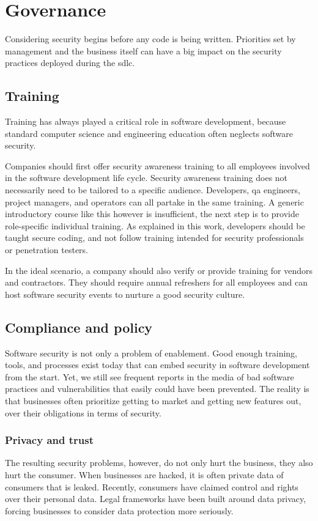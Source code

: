 \section{Governance}
\label{sec:related-plan}
Considering security begins before any code is being written.
Priorities set by management and the business itself can have a big impact on the security practices deployed during the \gls{sdlc}.

\subsection{Training}
Training has always played a critical role in software development, because standard computer science and engineering education often neglects software security.

Companies should first offer security awareness training to all employees involved in the software development life cycle.
Security awareness training does not necessarily need to be tailored to a specific audience.
Developers, \gls{qa} engineers, project managers, and operators can all partake in the same training.
A generic introductory course like this however is insufficient, the next step is to provide role-specific individual training.
As explained in this work, developers should be taught secure coding, and not follow training intended for security professionals or penetration testers.

In the ideal scenario, a company should also verify or provide training for vendors and contractors.
They should require annual refreshers for all employees and can host software security events to nurture a good security culture.

\subsection{Compliance and policy}
Software security is not only a problem of enablement.
Good enough training, tools, and processes exist today that can embed security in software development from the start.
Yet, we still see frequent reports in the media of bad software practices and vulnerabilities that easily could have been prevented.
The reality is that businesses often prioritize getting to market and getting new features out, over their obligations in terms of security.

\subsubsection{Privacy and trust}
The resulting security problems, however, do not only hurt the business, they also hurt the consumer.
When businesses are hacked, it is often private data of consumers that is leaked.
Recently, consumers have claimed control and rights over their personal data.
Legal frameworks have been built around data privacy, forcing businesses to consider data protection more seriously.

